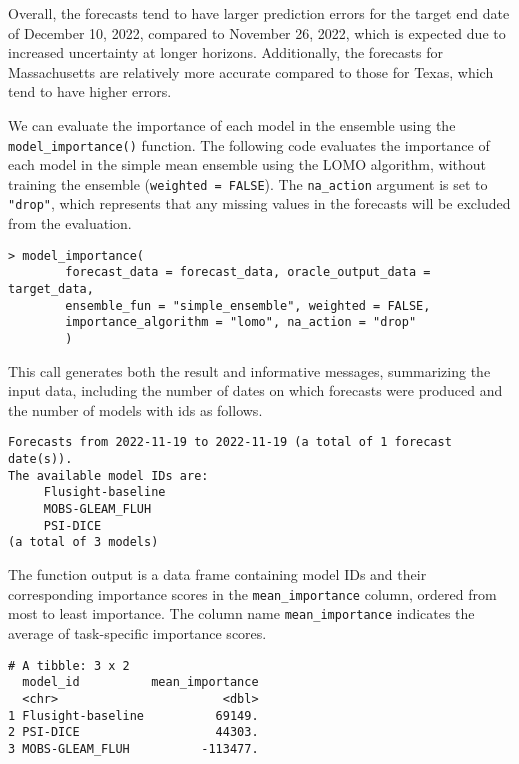 \documentclass[
  article,
  shortnames,
  notitle]{jss}
\begin{document}
Overall, the forecasts tend to have larger prediction errors for the
target end date of December 10, 2022, compared to November 26, 2022,
which is expected due to increased uncertainty at longer horizons.
Additionally, the forecasts for Massachusetts are relatively more
accurate compared to those for Texas, which tend to have higher errors.

\normalsize

We can evaluate the importance of each model in the ensemble using the
\texttt{model\_importance()} function. The following code evaluates the
importance of each model in the simple mean ensemble using the LOMO
algorithm, without training the ensemble (\texttt{weighted\ =\ FALSE}).
The \texttt{na\_action} argument is set to \texttt{"drop"}, which
represents that any missing values in the forecasts will be excluded
from the evaluation.

\begin{verbatim}
> model_importance(
        forecast_data = forecast_data, oracle_output_data = target_data,
        ensemble_fun = "simple_ensemble", weighted = FALSE,
        importance_algorithm = "lomo", na_action = "drop"
        )
\end{verbatim}

This call generates both the result and informative messages,
summarizing the input data, including the number of dates on which
forecasts were produced and the number of models with ids as follows.

\small

\begin{verbatim}
Forecasts from 2022-11-19 to 2022-11-19 (a total of 1 forecast date(s)).
The available model IDs are:
     Flusight-baseline
     MOBS-GLEAM_FLUH
     PSI-DICE 
(a total of 3 models)
\end{verbatim}

\normalsize

The function output is a data frame containing model IDs and their
corresponding importance scores in the \texttt{mean\_importance} column,
ordered from most to least importance. The column name
\texttt{mean\_importance} indicates the average of task-specific
importance scores.

\small

\begin{verbatim}
# A tibble: 3 x 2
  model_id          mean_importance
  <chr>                       <dbl>
1 Flusight-baseline          69149.
2 PSI-DICE                   44303.
3 MOBS-GLEAM_FLUH          -113477.
\end{verbatim}
\end{document}
